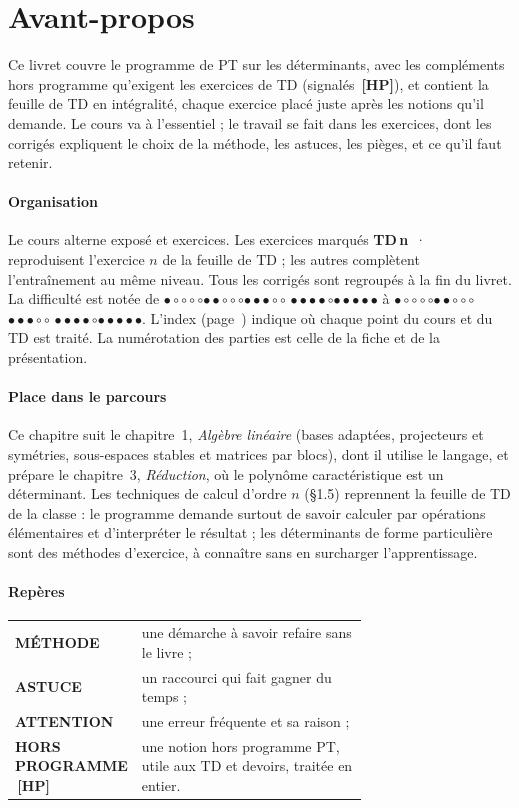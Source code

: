 \documentclass[a4paper,11pt]{article}
\numberwithin{equation}{section}
\numberwithin{figure}{section}
\numberwithin{table}{section}
\theoremstyle{enonce}
\theoremstyle{exemple}
\theoremstyle{remarque}
\newcommand{\niveau}[1]{{\color{Ocre}\footnotesize
  \ifcase#1\or$\bullet\circ\circ\circ\circ$\or$\bullet\bullet\circ\circ\circ$\or$\bullet\bullet\bullet\circ\circ$%
  \or$\bullet\bullet\bullet\bullet\circ$\or$\bullet\bullet\bullet\bullet\bullet$\fi}}
\newcommand{\HP}{\,{\sffamily\bfseries\scriptsize\textcolor{Brique}{[HP]}}}
\newcommand{\TD}[1]{{\color{Ocre}\bfseries TD\,#1}\ ·\ }
\begin{document}
\thispagestyle{plain}
\section*{Avant-propos}

Ce livret couvre le programme de PT sur les déterminants, avec les compléments hors programme qu'exigent les exercices de TD
(signalés \HP), et contient la feuille de TD en intégralité, chaque exercice placé juste après les notions qu'il demande. Le cours
va à l'essentiel ; le travail se fait dans les exercices, dont les corrigés expliquent le choix de la méthode, les astuces, les
pièges, et ce qu'il faut retenir.

\paragraph{Organisation} Le cours alterne exposé et exercices. Les exercices marqués \TD{n} reproduisent l'exercice
$n$ de la feuille de TD ; les autres complètent l'entraînement au même niveau. Tous les corrigés sont regroupés à la fin
du livret. La difficulté est notée de \niveau{1} à \niveau{5}. L'index (page~\pageref{sec:corresp}) indique où
chaque point du cours et du TD est traité. La numérotation des parties est celle de la fiche et de la présentation.

\paragraph{Place dans le parcours} Ce chapitre suit le chapitre~1, \emph{Algèbre linéaire} (bases adaptées, projecteurs et
symétries, sous-espaces stables et matrices par blocs), dont il utilise le langage, et prépare le chapitre~3, \emph{Réduction},
où le polynôme caractéristique est un déterminant. Les techniques de calcul d'ordre $n$ (§1.5) reprennent la feuille de TD de la
classe : le programme demande surtout de savoir calculer par opérations élémentaires et d'interpréter le résultat ; les
déterminants de forme particulière sont des méthodes d'exercice, à connaître sans en surcharger l'apprentissage.

\paragraph{Repères}
\begin{center}
\renewcommand{\arraystretch}{1.25}\small
\begin{tabular}{>{\sffamily\bfseries\footnotesize}l p{0.7\linewidth}}
\colorbox{Bleu}{\color{white}MÉTHODE} & une démarche à savoir refaire sans le livre ;\\
\color{Ocre}ASTUCE & un raccourci qui fait gagner du temps ;\\
\color{Brique}ATTENTION & une erreur fréquente et sa raison ;\\
\color{Brique}HORS PROGRAMME \HP & une notion hors programme PT, utile aux TD et devoirs, traitée en entier.\\
\end{tabular}
\end{center}
\end{document}
